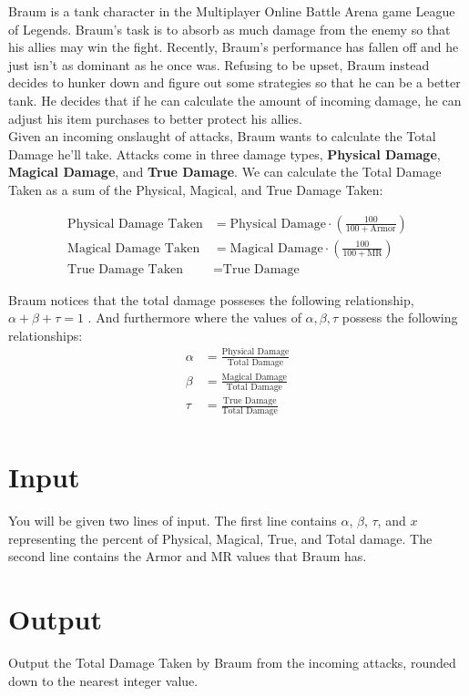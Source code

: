 
Braum is a tank character in the Multiplayer Online Battle Arena game League of Legends. Braum’s task is to absorb as
much damage from the enemy so that his allies may win the fight. Recently, Braum's performance has fallen off and he just isn't as
dominant as he once was. Refusing to be upset, Braum instead decides to hunker down and figure out some strategies so that he can 
be a better tank. He decides that if he can calculate the amount of incoming damage, he can adjust his item purchases to
better protect his allies.\\

Given an incoming onslaught of attacks, Braum wants to calculate the Total Damage he’ll take.
Attacks come in three damage types, \textbf{Physical Damage}, \textbf{Magical Damage}, and \textbf{True Damage}.
We can calculate the Total Damage Taken as a sum of the Physical, Magical, and True Damage Taken:

\begin{align*}
    \text{Physical Damage Taken} &= \text{Physical Damage} \cdot \left( \frac{100}{100 + \text{Armor}}\right) \\
    \text{Magical Damage Taken} &= \text{Magical Damage} \cdot \left( \frac{100}{100 + \text{MR}}\right) \\
    \text{True Damage Taken} &= \text{True Damage}
\end{align*}

Braum notices that the total damage posseses the following relationship, $\alpha + \beta + \tau = 1$ . And furthermore
where the values of $\alpha, \beta, \tau$ possess the following relationships:
\begin{align*}
    \alpha &= \frac{\text{Physical Damage}}{\text{Total Damage}} \\
    \beta &= \frac{\text{Magical Damage}}{\text{Total Damage}} \\
    \tau  &= \frac{\text{True Damage}}{\text{Total Damage}}\\
\end{align*}

\section*{Input}
You will be given two lines of input. The first line contains $\alpha$, $\beta$, $\tau$, and $x$ representing the
percent of Physical, Magical, True, and Total damage. The second line contains the Armor and MR values that Braum has.

\section*{Output}
Output the Total Damage Taken by Braum from the incoming attacks, rounded down to the nearest integer value.
